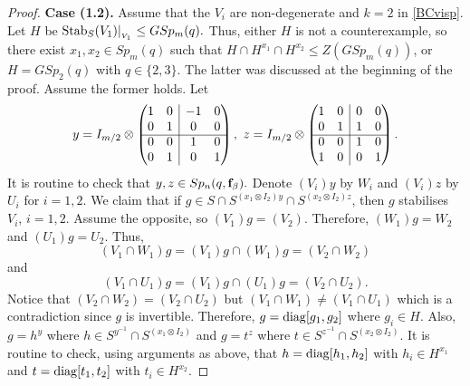 \begin{proof}
{\bf Case (1.2).} Assume that the $V_i$ are non-degenerate and $k= 2$ in \eqref{BCvisp}. Let $H$ be $\mathrm{Stab}_S(V_1)|_{_{V_1}} \le GSp_m(q).$ Thus, either $H$ is not a counterexample, so there exist $x_1, x_2 \in Sp_m(q)$ such that $H \cap H^{x_1} \cap H^{x_2} \le Z(GSp_m(q))$, or  $H=GSp_2(q)$ with $q \in \{2,3\}$. The latter was discussed at the beginning of the proof. Assume the former holds.   
Let 
\begin{equation*} y= I_{m/2} \otimes
\begin{pmatrix}
1      & \multicolumn{1}{c|}{0}& -1& 0   \\
0      & \multicolumn{1}{c|}{1}& 0 & 0 \\ \cline{1-4}
0      & \multicolumn{1}{c|}{0}& 1 & 0   \\
0      & \multicolumn{1}{c|}{1}& 0 & 1
\end{pmatrix}, \text{ }
z= I_{m/2} \otimes
\begin{pmatrix}
1      & \multicolumn{1}{c|}{0}& 0 & 0   \\
0      & \multicolumn{1}{c|}{1}& 1 & 0 \\ \cline{1-4}
0      & \multicolumn{1}{c|}{0}& 1 & 0   \\
1      & \multicolumn{1}{c|}{0}& 0 & 1
\end{pmatrix}.
\end{equation*}
It is routine to check that $y,z \in Sp_n(q, {\bf f}_{\beta}).$
Denote $(V_i)y$ by $W_i$ and $(V_i)z$ by $U_i$ for $i=1,2.$ We claim that if $g \in S \cap S^{(x_1 \otimes I_2)y} \cap S^{(x_2 \otimes I_2)z}$, then $g$ stabilises $V_i$, $i=1,2.$ Assume the opposite, so $(V_1)g=(V_2).$ Therefore, $(W_1)g=W_2$ and $(U_1)g=U_2.$ Thus, 
$$(V_1 \cap W_1)g= (V_1)g \cap (W_1)g= (V_2 \cap W_2)$$ 
and 
$$(V_1 \cap U_1)g= (V_1)g \cap (U_1)g= (V_2 \cap U_2).$$
 Notice that $(V_2 \cap W_2)=(V_2 \cap U_2)$ but $(V_1 \cap W_1) \ne (V_1 \cap U_1)$ which is a contradiction since $g$ is invertible. Therefore, $g= \mathrm{diag}[g_1, g_2]$ where $g_i \in H.$  Also, $g=h^y$ where $h \in S^{y^{-1}} \cap S^{(x_1 \otimes I_2)}$ and $g=t^z$ where $t \in S^{z^{-1}} \cap S^{(x_2 \otimes I_2)}$. It is routine to check, using arguments as above, that $h=\mathrm{diag}[h_1, h_2]$ with $h_i \in H^{x_1}$ and $t=\mathrm{diag}[t_1,t_2]$ with $t_i \in H^{x_2}.$


\end{proof}
